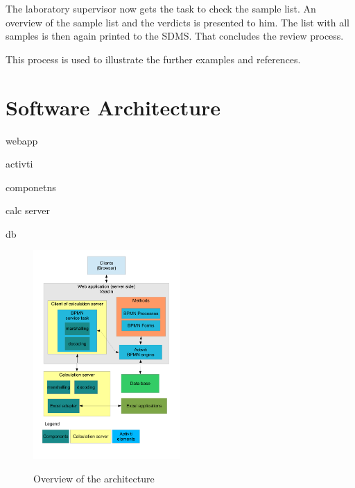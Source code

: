 \documentclass[paper=a4,twoside=false,BCOR=0mm,DIV=calc,fontsize=12pt]{scrartcl}
\begin{document}
The laboratory supervisor now gets the task to check the sample list. An overview of the sample list and the verdicts is presented to him.
The list with all samples is then again printed to the SDMS. That concludes the review process.

This process is used to illustrate the further examples and references.





\section{Software Architecture}

webapp

activti 

componetns

calc server

db

\begin{figure}
    \begin{center}
      \includegraphics[width=0.5\textwidth]{./img/ArchitectrueOverview.pdf}\\
    \end{center}
  \caption{Overview of the architecture}
  \label{architectureoverview}
\end{figure} 
\end{document}
